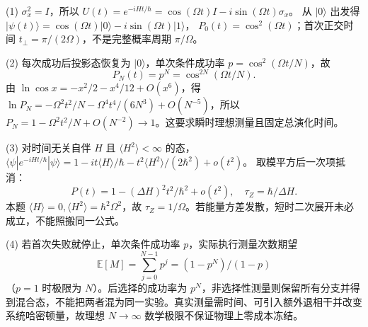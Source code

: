 (1) \(\sigma_x^2=I\)，所以
\(U(t)=e^{-iHt/\hbar}=\cos(\Omega t)I-i\sin(\Omega t)\sigma_x\)。
从 \(|0\rangle\) 出发得
\(|\psi(t)\rangle=\cos(\Omega t)|0\rangle-i\sin(\Omega t)|1\rangle\)，
\(P_0(t)=\cos^2(\Omega t)\)；首次正交时间 \(t_\perp=\pi/(2\Omega)\)，不是完整概率周期 \(\pi/\Omega\)。

(2) 每次成功后投影态恢复为 \(|0\rangle\)，单次条件成功率 \(p=\cos^2(\Omega t/N)\)，故
\[
\boxed{P_N(t)=p^N=\cos^{2N}(\Omega t/N)}.
\]
由 \(\ln\cos x=-x^2/2-x^4/12+O(x^6)\)，得
\(\ln P_N=-\Omega^2t^2/N-\Omega^4t^4/(6N^3)+O(N^{-5})\)，所以 \(P_N=1-\Omega^2t^2/N+O(N^{-2})\to1\)。这要求瞬时理想测量且固定总演化时间。

(3) 对时间无关自伴 \(H\) 且 \(\langle H^2\rangle<\infty\) 的态，
\(\langle\psi|e^{-iHt/\hbar}|\psi\rangle=1-it\langle H\rangle/\hbar-t^2\langle H^2\rangle/(2\hbar^2)+o(t^2)\)。
取模平方后一次项抵消：
\[
P(t)=1-(\Delta H)^2t^2/\hbar^2+o(t^2),\quad
\boxed{\tau_Z=\hbar/\Delta H}.
\]
本题 \(\langle H\rangle=0,\langle H^2\rangle=\hbar^2\Omega^2\)，故 \(\tau_Z=1/\Omega\)。若能量方差发散，短时二次展开未必成立，不能照搬同一公式。

(4) 若首次失败就停止，单次条件成功率 \(p\)，实际执行测量次数期望
\[
\boxed{\mathbb E[M]=\sum_{j=0}^{N-1}p^j=(1-p^N)/(1-p)}
\]
（\(p=1\) 时极限为 \(N\)）。后选择的成功率为 \(p^N\)，非选择性测量则保留所有分支并得到混合态，不能把两者混为同一实验。真实测量需时间、可引入额外退相干并改变系统哈密顿量，故理想 \(N\to\infty\) 数学极限不保证物理上零成本冻结。
